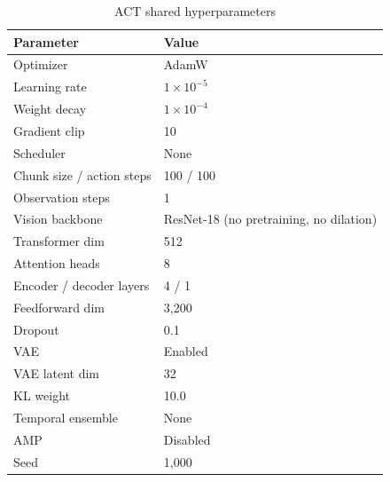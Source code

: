 \documentclass[conference]{IEEEtran}
\begin{document}
\begin{minipage}[b]{0.48\linewidth}
    \begin{table}[H]
    \centering
    \caption{ACT shared hyperparameters}
    \label{tab:act_hyperparams}
    \begin{tabular}{ll}
    \toprule
    \textbf{Parameter} & \textbf{Value} \\
    \midrule
    Optimizer & AdamW \\
    Learning rate & $1\times10^{-5}$ \\
    Weight decay & $1\times10^{-4}$ \\
    Gradient clip & 10 \\
    Scheduler & None \\
    Chunk size / action steps & 100 / 100 \\
    Observation steps & 1 \\
    Vision backbone & ResNet-18 (no pretraining, no dilation) \\
    Transformer dim & 512 \\
    Attention heads & 8 \\
    Encoder / decoder layers & 4 / 1 \\
    Feedforward dim & 3{,}200 \\
    Dropout & 0.1 \\
    VAE & Enabled \\
    VAE latent dim & 32 \\
    KL weight & 10.0 \\
    Temporal ensemble & None \\
    AMP & Disabled \\
    Seed & 1{,}000 \\
    \bottomrule
    \end{tabular}
    \end{table}
\end{minipage}
\end{document}
